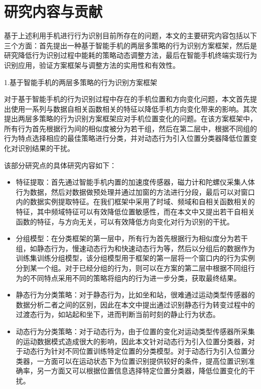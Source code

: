 \section{研究内容与贡献}
\par 基于上述利用手机进行行为识别目前所存在的问题，本文的主要研究内容包括以下三个方面：首先提出一种基于智能手机的两层多策略的行为识别方案框架，然后是研究降低行为识别过程中能耗的策略动态调整方法，最后在智能手机终端实现行为识别应用，验证方案框架与调整方法的实用性和有效性。

\par 1.基于智能手机的两层多策略的行为识别方案框架

\par 对于基于智能手机的行为识别过程中存在的手机位置和方向变化问题，本文首先提出使用一系列与数据自相关函数相关的特征以降低手机方向变化带来的影响。其次提出两层多策略的行为识别方案框架应对手机位置变化的问题。在该方案框架中，所有行为首先根据行为间的相似度被分为若干组，然后在第二层中，根据不同组的行为特点选择相应的最佳策略进行分类，并对动态行为引入位置分类器降低位置变化对识别结果的干扰。
\par 该部分研究点的具体研究内容如下：

\begin{itemize}
\item 特征提取：首先通过智能手机内置的加速度传感器，磁力计和陀螺仪采集人体行为数据，然后对数据做预处理并通过加窗的方法进行分段，最后可以对窗口内的数据实例提取特征。在我们框架中采用了时域、频域和自相关函数相关的特征，其中频域特征可以有效降低位置敏感性，而在本文中又提出若干自相关函数的特征，与方向无关，可以有效降低方向变化对行为识别的干扰。
\item 分组模型：在分类框架的第一层中，所有行为首先根据行为相似度分为若干组，如静态行为，慢速动态行为和快速动态行为等，然后以分组后的数据作为训练集训练分组模型，该分组模型用于框架的第一层将一个窗口内的行为实例分到某一个组。对于已经分组的行为，则可以在方案的第二层中根据不同组行为的不同特点采用不同的策略将组内的行为进一步分类，获取最终结果。
\item 静态行为分类策略：对于静态行为，比如坐和站，很难通过运动类型传感器的数据分析二者之间的区别，因此在本文中提出通过识别静态行为转变过程中的过渡态行为，如站起和坐下，进而判断当前时刻的静止行为状态。
\item 动态行为分类策略：对于动态行为，由于位置的变化对运动类型传感器所采集的运动数据模式造成很大的影响，因此本文针对动态行为引入位置分类器，对于动态行为针对不同位置训练特定位置的分类模型。对于动态行为引入位置分类器，一方面可以在运动状态下为位置识别提供较好的条件，提高位置识别准确率，另一方面又可以根据位置信息选择特定位置分类器，降低位置变化的干扰。
\end{itemize}

